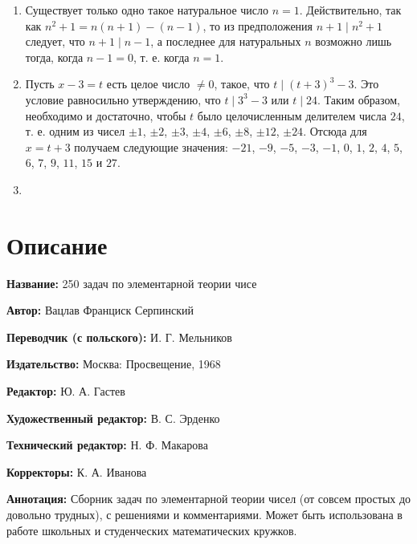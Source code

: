 \documentclass[12pt, a4paper, openany]{book}
\begin{document}
\begin{enumerate}
	\item Существует только одно такое натуральное число $n=1$. Действительно, так как $n^2+1=n(n+1)-(n-1)$, то из предположения $n+1 \mid n^2+1$ следует, что $n+1 \mid n-1$, а последнее для натуральных $n$ возможно лишь тогда, когда $n-1=0$, т. е. когда $n=1$.
	\item Пусть $x-3=t$ есть целое число $\neq0$, такое, что $t \mid (t+3)^3-3$. Это условие равносильно утверждению, что $t \mid 3^3-3$ или $t \mid 24$. Таким образом, необходимо и достаточно, чтобы $t$ было целочисленным делителем числа $24$, т. е. одним из чисел $\pm1$, $\pm2$, $\pm3$, $\pm4$, $\pm6$, $\pm8$, $\pm12$, $\pm24$. Отсюда для $x=t+3$ получаем следующие значения: $-21$, $-9$, $-5$, $-3$, $-1$, $0$, $1$, $2$, $4$, $5$, $6$, $7$, $9$, $11$, $15$ и $27$.
	\item
	
\end{enumerate}


	\newpage
	\tableofcontents
	
	\thispagestyle{empty} %
	
	\newpage
	
	\setcounter{secnumdepth}{0}  
	
	
		\section*{Описание}
	
	{\bf Название:} 250 задач по элементарной теории чисе
	
{\bf Автор:} Вацлав Франциск Серпинский

{\bf Переводчик (с польского):} И. Г. Мельников
	
{\bf Издательство:} Москва: Просвещение, 1968
	
		{\bf Редактор:} Ю. А. Гастев
	
		{\bf Художественный редактор:} В. С. Эрденко
	
		{\bf Технический редактор:} Н. Ф. Макарова
	
		{\bf Корректоры:} К. А. Иванова
	
		{\bf Аннотация:} Сборник задач по элементарной теории чисел (от совсем простых до довольно трудных), с решениями и комментариями. Может быть использована в работе школьных и студенческих математических кружков.
		\thispagestyle{empty} %

	
\end{document}
